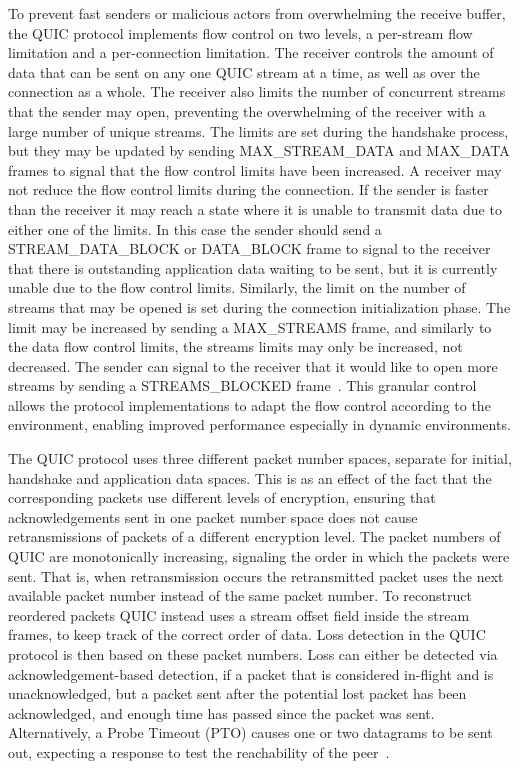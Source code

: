 \documentclass[english, 12pt, a4paper, elec, utf8, a-2b, online]{aaltothesis}
\begin{document}
To prevent fast senders or malicious actors from overwhelming the receive buffer,
the QUIC protocol implements flow control on two levels, a per-stream flow limitation
and a per-connection limitation. The receiver controls the amount of data that can
be sent on any one QUIC stream at a time, as well as over the connection as a whole.
The receiver also limits the number of concurrent streams that the sender may open,
preventing the overwhelming of the receiver with a large number of unique streams.
The limits are set during the handshake process, but they may be updated by sending
MAX\_STREAM\_DATA and MAX\_DATA frames to signal that the flow control limits have
been increased. A receiver may not reduce the flow control limits during the connection.
If the sender is faster than the receiver it may reach a state where it is unable
to transmit data due to either one of the limits. In this case the sender should
send a STREAM\_DATA\_BLOCK or DATA\_BLOCK frame to signal to the receiver that
there is outstanding application data waiting to be sent, but it is currently unable
due to the flow control limits. Similarly, the limit on the number of streams that
may be opened is set during the connection initialization phase. The limit may be
increased by sending a MAX\_STREAMS frame, and similarly to the data flow control limits,
the streams limits may only be increased, not decreased. The sender can signal to the
receiver that it would like to open more streams by sending a STREAMS\_BLOCKED frame~\cite{rfc9000}.
This granular control allows the protocol implementations to adapt the flow control
according to the environment, enabling improved performance especially in dynamic environments.

The QUIC protocol uses three different packet number spaces, separate for initial,
handshake and application data spaces. This is as an effect of the fact that the
corresponding packets use different levels of encryption, ensuring that acknowledgements
sent in one packet number space does not cause retransmissions of packets of a different
encryption level. The packet numbers of QUIC are monotonically increasing, signaling
the order in which the packets were sent. That is, when retransmission occurs the
retransmitted packet uses the next available packet number instead of the same packet number.
To reconstruct reordered packets QUIC instead
uses a stream offset field inside the stream frames, to keep track of the correct
order of data. Loss detection in the QUIC protocol is then based on these packet
numbers. Loss can either be detected via acknowledgement-based detection,
if a packet that is considered in-flight and is unacknowledged, but a packet
sent after the potential lost packet has been acknowledged, and enough time has passed
since the packet was sent. Alternatively, a Probe Timeout (PTO) causes one or two
datagrams to be sent out, expecting a response to test the reachability of the peer~\cite{rfc9002}.
\end{document}
